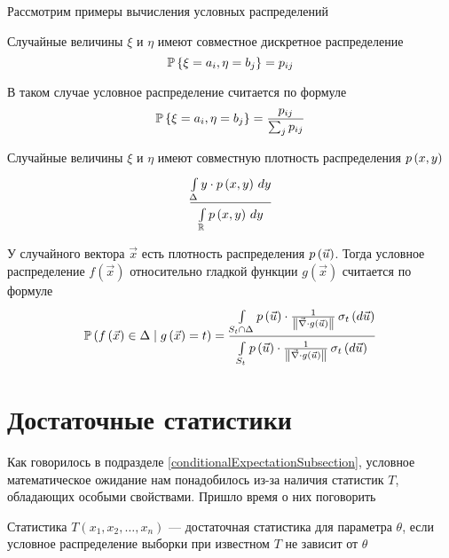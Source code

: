 Рассмотрим примеры вычисления условных распределений

\begin{example}
    Случайные величины $\xi$ и $\eta$ имеют совместное дискретное распределение
    $$\Probability{\xi = a_i, \eta = b_j} = p_{ij}$$

    В таком случае условное распределение считается по формуле
    $$\Probability{\xi = a_i, \eta = b_j} = \frac{p_{ij}}{\sum_j p_{ij}}$$
\end{example}

\begin{example}
    Случайные величины $\xi$ и $\eta$ имеют
    совместную плотность распределения $\pdf{x,y}$
        $$\frac{\integral{\Delta}{}{y}{y \cdot \pdf{x,y}}}
            {\integral{\mathbb{R}}{}{y}{\pdf{x,y}}}$$
\end{example}

\begin{example}
    У случайного вектора $\vec{x}$ есть плотность распределения $\pdf{\vec{u}}$.
    Тогда условное распределение $f\left( \vec{x} \right)$ относительно
    гладкой функции $g\left( \vec{x} \right)$ считается по формуле
    $$\probability{f\left( \vec{x} \right) \in \Delta
        \mcond g\left( \vec{x} \right) = t}
        = \frac{\integrall{S_t \cap \Delta}{\sigma_{t}\left(d\vec{u} \right)}{
            \pdf{\vec{u}} \cdot \frac{1}{
                \left\| \vec{\nabla} \cdot g\left( \vec{u} \right) \right\|}}}
            {\integrall{S_t}{\sigma_{t}\left(d\vec{u} \right)}{
                \pdf{\vec{u}} \cdot \frac{1}{
                    \left\| \vec{\nabla}
                        \cdot g\left( \vec{u} \right) \right\|}}}$$
\end{example}

\section{Достаточные статистики}
Как говорилось в подразделе \ref{conditionalExpectationSubsection},
условное математическое ожидание нам понадобилось из-за наличия
статистик $T$, обладающих особыми свойствами.
Пришло время о них поговорить

\begin{definition}
    Статистика $T\left( x_1, x_2, \dots, x_n \right)$ --- достаточная статистика
    для параметра $\theta$, если условное распределение выборки
    при известном $T$ не зависит от $\theta$
\end{definition}

